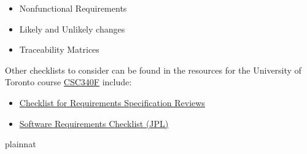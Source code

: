 \documentclass[12pt]{article}
\begin{document}
\begin{itemize}
\item Nonfunctional Requirements

\item Likely and Unlikely changes

\item Traceability Matrices

\end{itemize}

Other checklists to consider can be found in the resources for the University of
Toronto course
\href{https://www.cs.toronto.edu/~sme/CSC340F/2005/assignments/inspections/}
{CSC340F} include:

\begin{itemize}
  \item
  \href{https://www.cs.toronto.edu/~sme/CSC340F/2005/assignments/inspections/reqts_checklist.pdf}
  {Checklist for Requirements Specification Reviews}
  \item
  \href{https://www.cs.toronto.edu/~sme/CSC340F/2005/assignments/inspections/JPL_reqts_clist.pdf}
  {Software Requirements Checklist (JPL)}
\end{itemize}

 {plainnat}

\end{document}
